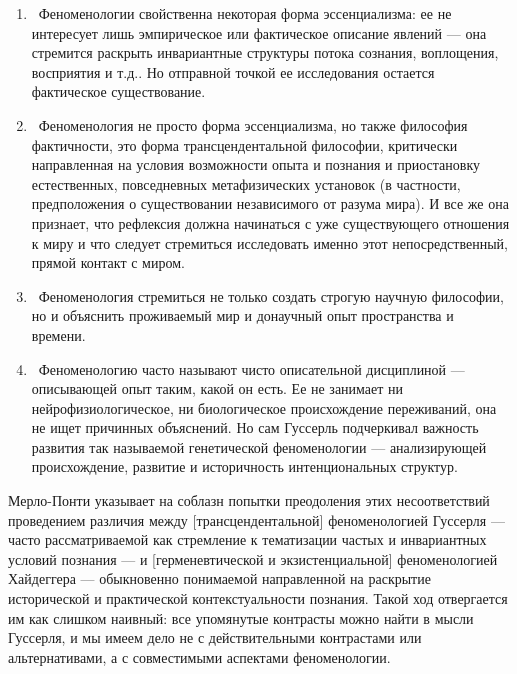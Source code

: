 \documentclass[11pt]{book}
\begin{document}
\begin{enumerate}
  \item\ Феноменологии свойственна некоторая форма эссенциализма: ее не интересует лишь эмпирическое или фактическое описание явлений --- она стремится раскрыть инвариантные структуры потока сознания, воплощения, восприятия и т.д.. Но отправной точкой ее исследования остается фактическое существование.
  \item\ Феноменология не просто форма эссенциализма, но также философия фактичности, это форма трансцендентальной философии, критически направленная на условия возможности опыта и познания и приостановку естественных, повседневных метафизических установок (в частности, предположения о существовании независимого от разума мира). И все же она признает, что рефлексия должна начинаться с уже существующего отношения к миру и что следует стремиться исследовать именно этот непосредственный, прямой контакт с миром.
  \item\ Феноменология стремиться не только создать строгую научную философии, но и объяснить проживаемый мир и донаучный опыт пространства и времени.
  \item\ Феноменологию часто называют чисто описательной дисциплиной --- описывающей опыт таким, какой он есть. Ее не занимает ни нейрофизиологическое, ни биологическое происхождение переживаний, она не ищет причинных объяснений. Но сам Гуссерль подчеркивал важность развития так называемой генетической феноменологии --- анализирующей происхождение, развитие и историчность интенциональных структур.
\end{enumerate}

Мерло-Понти указывает на соблазн попытки преодоления этих несоответствий проведением различия между [трансцендентальной] феноменологией Гуссерля --- часто рассматриваемой как стремление к тематизации частых и инвариантных условий познания --- и [герменевтической и экзистенциальной] феноменологией Хайдеггера --- обыкновенно понимаемой направленной на раскрытие исторической и практической контекстуальности познания. Такой ход отвергается им как слишком наивный: все упомянутые контрасты можно найти в мысли Гуссерля, и мы имеем дело не с действительными контрастами или альтернативами, а с совместимыми аспектами феноменологии.
\end{document}
